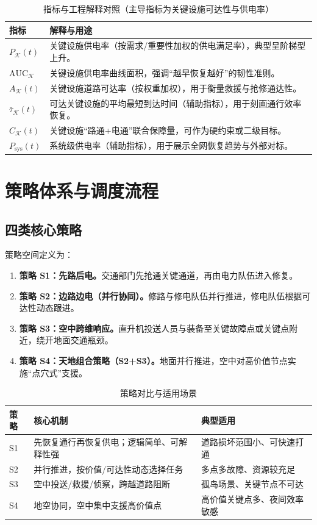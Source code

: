 \documentclass[UTF8,zihao=-4,a4paper,fontset=fandol]{ctexrep}
\begin{document}
\begin{table}[H]
\centering
\caption{指标与工程解释对照（主导指标为关键设施可达性与供电率）}
\label{tab:metrics}
\begin{tabularx}{0.98\textwidth}{lX}
\toprule
\textbf{指标} & \textbf{解释与用途}\\
\midrule
$P_{\mathcal{K}}(t)$ & 关键设施供电率（按需求/重要性加权的供电满足率），典型呈阶梯型上升。\\
$\text{AUC}_{\mathcal{K}}$ & 关键设施供电率曲线面积，强调“越早恢复越好”的韧性准则。\\
$A_{\mathcal{K}}(t)$ & 关键设施道路可达率（按权重加权），用于衡量救援与抢修通达性。\\
$\bar{\tau}_{\mathcal{K}}(t)$ & 可达关键设施的平均最短到达时间（辅助指标），用于刻画通行效率恢复。\\
$C_{\mathcal{K}}(t)$ & 关键设施“路通+电通”联合保障量，可作为硬约束或二级目标。\\
$P_{\text{sys}}(t)$ & 系统级供电率（辅助指标），用于展示全网恢复趋势与外部对标。\\
\bottomrule
\end{tabularx}
\end{table}

\chapter{策略体系与调度流程}\label{ch:strategy}
\section{四类核心策略}
策略空间定义为：
\begin{enumerate}[leftmargin=2em]
  \item \textbf{策略 S1：先路后电。}交通部门先抢通关键通道，再由电力队伍进入修复。
  \item \textbf{策略 S2：边路边电（并行协同）。}修路与修电队伍并行推进，修电队伍根据可达性动态跟进。
  \item \textbf{策略 S3：空中跨维响应。}直升机投送人员与装备至关键故障点或关键点附近，绕开地面交通瓶颈。
  \item \textbf{策略 S4：天地组合策略（S2+S3）。}地面并行推进，空中对高价值节点实施“点穴式”支援。
\end{enumerate}

\begin{table}[H]
\centering
\caption{策略对比与适用场景}
\label{tab:strategy}
\begin{tabularx}{0.98\textwidth}{lXl}
\toprule
\textbf{策略} & \textbf{核心机制} & \textbf{典型适用}\\
\midrule
S1 & 先恢复通行再恢复供电；逻辑简单、可解释性强 & 道路损坏范围小、可快速打通\\
S2 & 并行推进，按价值/可达性动态选择任务 & 多点多故障、资源较充足\\
S3 & 空中投送/救援/侦察，跨越道路阻断 & 孤岛场景、关键节点不可达\\
S4 & 地空协同，空中集中支援高价值点 & 高价值关键点多、夜间效率敏感\\
\bottomrule
\end{tabularx}
\end{table}
\end{document}
